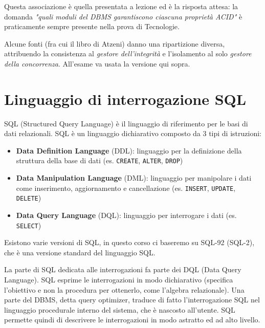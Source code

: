 \documentclass[a4paper,twoside]{article}
\begin{document}
\begin{define}
  Questa associazione è quella presentata a lezione ed è la risposta attesa: la domanda
  \textit{"quali moduli del DBMS garantiscono ciascuna proprietà ACID"} è praticamente
  sempre presente nella prova di Tecnologie.

  \vspace{1em}
  \noindent
  Alcune fonti (fra cui il libro di Atzeni) danno una ripartizione diversa, attribuendo
  la consistenza al \textit{gestore dell'integrità} e l'isolamento al solo
  \textit{gestore della concorrenza}. All'esame va usata la versione qui sopra.
\end{define}

\section{Linguaggio di interrogazione SQL}
SQL (Structured Query Language) è il linguaggio di riferimento per le basi di dati
relazionali. SQL è un linguaggio dichiarativo composto da 3 tipi di istruzioni:
\begin{itemize}
\item \textbf{Data Definition Language} (DDL): linguaggio per la definizione della
  struttura della base di dati (es. \texttt{CREATE}, \texttt{ALTER}, \texttt{DROP})

\item \textbf{Data Manipulation Language} (DML): linguaggio per manipolare i dati
  come inserimento, aggiornamento e cancellazione (es. \texttt{INSERT}, \texttt{UPDATE},
  \texttt{DELETE})

\item \textbf{Data Query Language} (DQL): linguaggio per interrogare i dati (es.
  \texttt{SELECT})
\end{itemize}
Esistono varie versioni di SQL, in questo corso ci baseremo su SQL-92 (SQL-2), che è una versione
standard del linguaggio SQL.

\vspace{1em}
\noindent
La parte di SQL dedicata alle interrogazioni fa parte dei DQL (Data Query Language). SQL esprime le
interrogazioni in modo dichiarativo (specifica l’obiettivo e non la procedura per ottenerlo,
come l’algebra relazionale). Una parte del DBMS, detta query optimizer, traduce di
fatto l’interrogazione SQL nel linguaggio procedurale interno del sistema, che è nascosto
all’utente. SQL permette quindi di descrivere le interrogazioni in modo astratto ed ad
alto livello.
\end{document}

